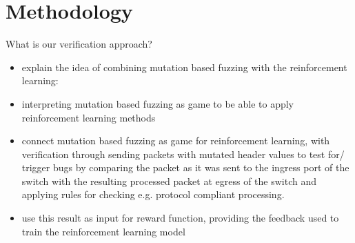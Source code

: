 \section{Methodology}
What is our verification approach?

\begin{itemize}
    \item explain the idea of combining mutation based fuzzing with the reinforcement learning:
    \item interpreting mutation based fuzzing as game to be able to apply reinforcement learning methods
    \item connect mutation based fuzzing as game for reinforcement learning, with verification through sending packets with mutated header values to test for/ trigger bugs by comparing the packet as it was sent to the ingress port of the switch with the resulting processed packet at egress of the switch and applying rules for checking e.g. protocol compliant processing.
    \item use this result as input for reward function, providing the feedback used to train the reinforcement learning model
\end{itemize}